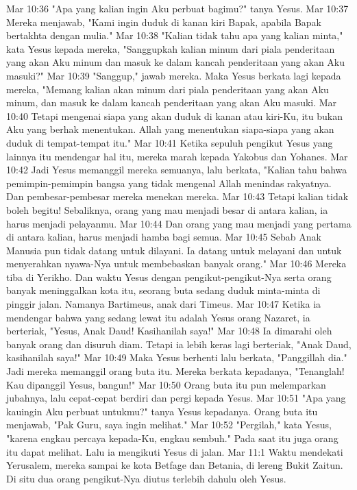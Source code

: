 Mar 10:36  "Apa yang kalian ingin Aku perbuat bagimu?" tanya Yesus.
Mar 10:37  Mereka menjawab, "Kami ingin duduk di kanan kiri Bapak, apabila Bapak bertakhta dengan mulia."
Mar 10:38  "Kalian tidak tahu apa yang kalian minta," kata Yesus kepada mereka, "Sanggupkah kalian minum dari piala penderitaan yang akan Aku minum dan masuk ke dalam kancah penderitaan yang akan Aku masuki?"
Mar 10:39  "Sanggup," jawab mereka. Maka Yesus berkata lagi kepada mereka, "Memang kalian akan minum dari piala penderitaan yang akan Aku minum, dan masuk ke dalam kancah penderitaan yang akan Aku masuki.
Mar 10:40  Tetapi mengenai siapa yang akan duduk di kanan atau kiri-Ku, itu bukan Aku yang berhak menentukan. Allah yang menentukan siapa-siapa yang akan duduk di tempat-tempat itu."
Mar 10:41  Ketika sepuluh pengikut Yesus yang lainnya itu mendengar hal itu, mereka marah kepada Yakobus dan Yohanes.
Mar 10:42  Jadi Yesus memanggil mereka semuanya, lalu berkata, "Kalian tahu bahwa pemimpin-pemimpin bangsa yang tidak mengenal Allah menindas rakyatnya. Dan pembesar-pembesar mereka menekan mereka.
Mar 10:43  Tetapi kalian tidak boleh begitu! Sebaliknya, orang yang mau menjadi besar di antara kalian, ia harus menjadi pelayanmu.
Mar 10:44  Dan orang yang mau menjadi yang pertama di antara kalian, harus menjadi hamba bagi semua.
Mar 10:45  Sebab Anak Manusia pun tidak datang untuk dilayani. Ia datang untuk melayani dan untuk menyerahkan nyawa-Nya untuk membebaskan banyak orang."
Mar 10:46  Mereka tiba di Yerikho. Dan waktu Yesus dengan pengikut-pengikut-Nya serta orang banyak meninggalkan kota itu, seorang buta sedang duduk minta-minta di pinggir jalan. Namanya Bartimeus, anak dari Timeus.
Mar 10:47  Ketika ia mendengar bahwa yang sedang lewat itu adalah Yesus orang Nazaret, ia berteriak, "Yesus, Anak Daud! Kasihanilah saya!"
Mar 10:48  Ia dimarahi oleh banyak orang dan disuruh diam. Tetapi ia lebih keras lagi berteriak, "Anak Daud, kasihanilah saya!"
Mar 10:49  Maka Yesus berhenti lalu berkata, "Panggillah dia." Jadi mereka memanggil orang buta itu. Mereka berkata kepadanya, "Tenanglah! Kau dipanggil Yesus, bangun!"
Mar 10:50  Orang buta itu pun melemparkan jubahnya, lalu cepat-cepat berdiri dan pergi kepada Yesus.
Mar 10:51  "Apa yang kauingin Aku perbuat untukmu?" tanya Yesus kepadanya. Orang buta itu menjawab, "Pak Guru, saya ingin melihat."
Mar 10:52  "Pergilah," kata Yesus, "karena engkau percaya kepada-Ku, engkau sembuh." Pada saat itu juga orang itu dapat melihat. Lalu ia mengikuti Yesus di jalan.
Mar 11:1  Waktu mendekati Yerusalem, mereka sampai ke kota Betfage dan Betania, di lereng Bukit Zaitun. Di situ dua orang pengikut-Nya diutus terlebih dahulu oleh Yesus.
